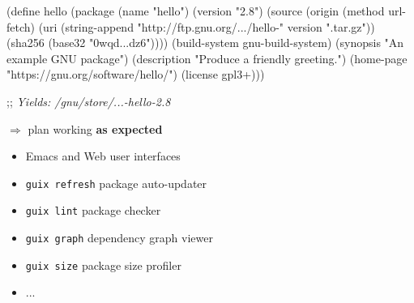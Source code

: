 \documentclass{beamer}
\begin{document}
\begin{frame}[fragile]
  \begin{semiverbatim}
    \small{
(define hello
  (\alert{package}
    (name "hello")
    (version "2.8")
    (source (\alert{origin}
              (method url-fetch)
              (uri (string-append
                    "http://ftp.gnu.org/\textrm{...}/hello-" version
                    ".tar.gz"))
              (sha256 (base32 "0wqd\textrm{...}dz6"))))
    (\alert{build-system} gnu-build-system)
    (synopsis "An example GNU package")
    (description "Produce a friendly greeting.")
    (home-page "https://gnu.org/software/hello/")
    (license gpl3+)))

;; \textsl{Yields: /gnu/store/\textrm{...}-hello-2.8}
}
  \end{semiverbatim}
\end{frame}

\begin{frame}[plain]
  \Large{$\Rightarrow$ plan working
    \textbf{as expected}}
  \\[1cm]
\end{frame}

\begin{frame}
  \Large{
  \begin{itemize}
  \item Emacs and Web user interfaces
  \item \texttt{guix refresh} package auto-updater
  \item \texttt{guix lint} package checker
  \item \texttt{guix graph} dependency graph viewer
  \item \texttt{guix size} package size profiler
  \item ...
  \end{itemize}
  }
\end{frame}
\end{document}
